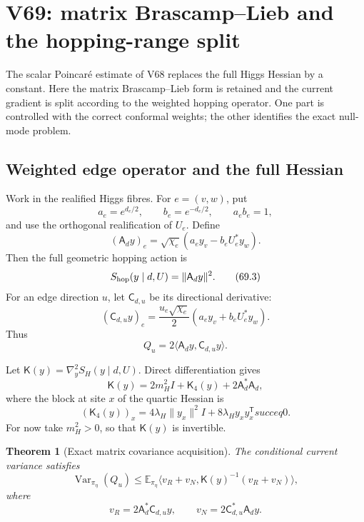 \documentclass[11pt]{article}
\newtheorem{theorem}{Theorem}[section]
\theoremstyle{remark}
\begin{document}
\section{V69: matrix Brascamp--Lieb and the hopping-range split}
\label{sec:v17v69}

The scalar Poincar\'e estimate of V68 replaces the full Higgs Hessian
by a constant.  Here the matrix Brascamp--Lieb form is retained and
the current gradient is split according to the weighted hopping
operator.  One part is controlled with the correct conformal weights;
the other identifies the exact null-mode problem.

\subsection{Weighted edge operator and the full Hessian}

Work in the realified Higgs fibres.  For
\(e=(v,w)\), put
\[
 a_e=e^{d_e/2},\qquad b_e=e^{-d_e/2},
 \qquad a_eb_e=1,                                 \tag{69.1}
\]
and use the orthogonal realification of \(U_e\).  Define
\[
 (\mathsf A_dy)_e
 =\sqrt{\chi_e}\left(a_ey_v-b_eU_e^*y_w\right).  \tag{69.2}
\]
Then the full geometric hopping action is
\[
 S_{\rm hop}(y\mid d,U)=\|\mathsf A_dy\|^2.       \tag{69.3}
\]
For an edge direction \(u\), let \(\mathsf C_{d,u}\) be its
directional derivative:
\[
 (\mathsf C_{d,u}y)_e
 =\frac{u_e\sqrt{\chi_e}}2
   \left(a_ey_v+b_eU_e^*y_w\right).               \tag{69.4}
\]
Thus
\[
 Q_u=2\langle\mathsf A_dy,\mathsf C_{d,u}y\rangle.
                                                               \tag{69.5}
\]

Let \(\mathsf K(y)=\nabla_y^2S_H(y\mid d,U)\).  Direct
differentiation gives
\[
\boxed{
 \mathsf K(y)
 =2m_H^2I+\mathsf K_4(y)+2\mathsf A_d^*\mathsf A_d,}             \tag{69.6}
\]
where the block at site \(x\) of the quartic Hessian is
\[
 (\mathsf K_4(y))_x
 =4\lambda_H\|y_x\|^2I+8\lambda_Hy_xy_x^{\mathsf T}succeq0.    \tag{69.7}
\]
For now take \(m_H^2>0\), so that \(\mathsf K(y)\) is invertible.

\begin{theorem}[Exact matrix covariance acquisition]
\label{thm:v17v69-bl}
The conditional current variance satisfies
\[
\boxed{
 \operatorname{Var}_{\pi_\eta}(Q_u)
 \leq
 \mathbb E_{\pi_\eta}
 \langle v_R+v_N,\mathsf K(y)^{-1}(v_R+v_N)\rangle,}             \tag{69.8}
\]
where
\[
 v_R=2\mathsf A_d^*\mathsf C_{d,u}y,
 \qquad
 v_N=2\mathsf C_{d,u}^*\mathsf A_dy.             \tag{69.9}
\]
\end{theorem}
\end{document}
